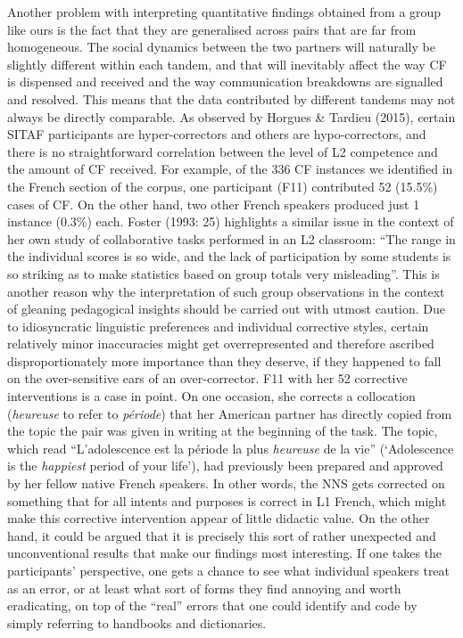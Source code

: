 \documentclass[12pt]{article}
\newenvironment{styleStandard}{\setlength\leftskip{0cm}\setlength\rightskip{0cm plus 1fil}\setlength\parindent{0cm}\setlength\parfillskip{0pt plus 1fil}\setlength\parskip{0cm plus 1pt}\writerlistparindent\writerlistleftskip\leavevmode\normalfont\normalsize\writerlistlabel\ignorespaces}{\unskip\vspace{0cm plus 1pt}\par}
\newcommand\writerlistleftskip{}
\newcommand\writerlistparindent{}
\newcommand\writerlistlabel{}
\begin{document}
\begin{styleStandard}
Another problem with interpreting quantitative findings obtained from a group like ours is the fact that they are generalised across pairs that are far from homogeneous. The social dynamics between the two partners will naturally be slightly different within each tandem, and that will inevitably affect the way CF is dispensed and received and the way communication breakdowns are signalled and resolved. This means that the data contributed by different tandems may not always be directly comparable. As observed by Horgues \& Tardieu (2015), certain SITAF participants are hyper-correctors and others are hypo-correctors, and there is no straightforward correlation between the level of L2 competence and the amount of CF received. For example, of the 336 CF instances we identified in the French section of the corpus, one participant (F11) contributed 52 (15.5\%) cases of CF. On the other hand, two other French speakers produced just 1 instance (0.3\%) each. Foster (1993: 25) highlights a similar issue in the context of her own study of collaborative tasks performed in an L2 classroom: “The range in the individual scores is so wide, and the lack of participation by some students is so striking as to make statistics based on group totals very misleading”. This is another reason why the interpretation of such group observations in the context of gleaning pedagogical insights should be carried out with utmost caution. Due to idiosyncratic linguistic preferences and individual corrective styles, certain relatively minor inaccuracies might get overrepresented and therefore ascribed disproportionately more importance than they deserve, if they happened to fall on the over-sensitive ears of an over-corrector. F11 with her 52 corrective interventions is a case in point. On one occasion, she corrects a collocation (\textit{heureuse} to refer to \textit{période})\textit{ }that her American partner has directly copied from the topic the pair was given in writing at the beginning of the task. The topic, which read “L’adolescence est la période la plus \textit{heureuse} de la vie” (‘Adolescence is the \textit{happiest} period of your life’), had previously been prepared and approved by her fellow native French speakers. In other words, the NNS gets corrected on something that for all intents and purposes is correct in L1 French, which might make this corrective intervention appear of little didactic value. On the other hand, it could be argued that it is precisely this sort of rather unexpected and unconventional results that make our findings most interesting. If one takes the participants’ perspective, one gets a chance to see what individual speakers treat as an error, or at least what sort of forms they find annoying and worth eradicating, on top of the “real” errors that one could identify and code by simply referring to handbooks and dictionaries.
\end{styleStandard}
\end{document}
